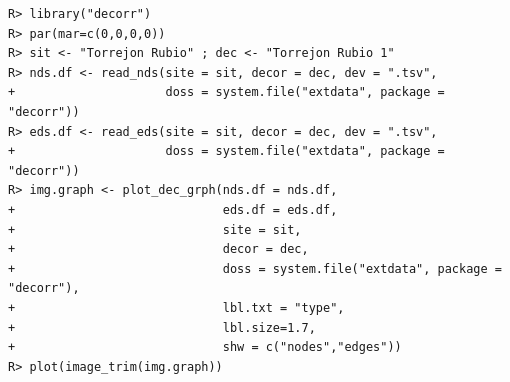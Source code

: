 \documentclass[article]{jss}\usepackage{knitr}
\begin{document}
\begin{kframe}
\begin{verbatim}
R> library("decorr")
R> par(mar=c(0,0,0,0))
R> sit <- "Torrejon Rubio" ; dec <- "Torrejon Rubio 1"
R> nds.df <- read_nds(site = sit, decor = dec, dev = ".tsv",
+                     doss = system.file("extdata", package = "decorr"))
R> eds.df <- read_eds(site = sit, decor = dec, dev = ".tsv",
+                     doss = system.file("extdata", package = "decorr"))
R> img.graph <- plot_dec_grph(nds.df = nds.df,
+                             eds.df = eds.df,
+                             site = sit,
+                             decor = dec,
+                             doss = system.file("extdata", package = "decorr"),
+                             lbl.txt = "type",
+                             lbl.size=1.7,
+                             shw = c("nodes","edges"))
R> plot(image_trim(img.graph))
\end{verbatim}
\end{kframe}\begin{figure}[H]


\end{figure}
\end{document}
